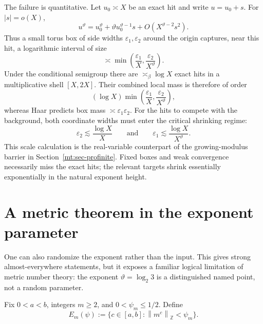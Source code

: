 \documentclass[11pt,oneside]{article}
\theoremstyle{definition}
\theoremstyle{remark}
\newcommand{\Z}{\mathbb Z}
\newcommand{\thetaq}{\vartheta}
\newcommand{\distZ}[1]{\left\lVert #1\right\rVert_{\Z}}
\begin{document}
The failure is quantitative.  Let $u_0\asymp X$ be an exact hit and write $u=u_0+s$.  For
$|s|=o(X)$,
\[
 u^{\thetaq}=u_0^{\thetaq}
 +\thetaq u_0^{\thetaq-1}s+O(X^{\thetaq-2}s^2).
\]
Thus a small torus box of side widths $\varepsilon_1,\varepsilon_2$ around the origin captures,
near this hit, a logarithmic interval of size
\begin{equation}
 \asymp
 \min\!\left(\frac{\varepsilon_1}{X},
              \frac{\varepsilon_2}{X^{\thetaq}}\right).
 \label{mt:eq-one-hit-log-mass}
\end{equation}
Under the conditional semigroup there are $\asymp_\beta\log X$ exact hits in a multiplicative
shell $[X,2X]$.  Their combined local mass is therefore of order
\begin{equation}
 (\log X)
 \min\!\left(\frac{\varepsilon_1}{X},
              \frac{\varepsilon_2}{X^{\thetaq}}\right),
 \label{mt:eq-all-hit-log-mass}
\end{equation}
whereas Haar predicts box mass $\asymp\varepsilon_1\varepsilon_2$.  For the hits to compete with
the background, both coordinate widths must enter the critical shrinking regime:
\begin{equation}
 \varepsilon_2\lesssim\frac{\log X}{X}
 \qquad\text{and}\qquad
 \varepsilon_1\lesssim\frac{\log X}{X^{\thetaq}}.
 \label{mt:eq-visibility-scale}
\end{equation}
This scale calculation is the real-variable counterpart of the growing-modulus barrier in
Section~\ref{mt:sec-profinite}.  Fixed boxes and weak convergence necessarily miss the exact
hits; the relevant targets shrink essentially exponentially in the natural exponent height.

\section{A metric theorem in the exponent parameter}
\label{mt:sec-metric-parameter}

One can also randomize the exponent rather than the input.  This gives strong almost-everywhere
statements, but it exposes a familiar logical limitation of metric number theory: the exponent
$\thetaq=\log_2 3$ is a distinguished named point, not a random parameter.

Fix $0<a<b$, integers $m\ge2$, and $0<\psi_m\le1/2$.  Define
\begin{equation}
 E_m(\psi):=
 \{c\in[a,b]:\distZ{m^c}<\psi_m\}.
 \label{mt:eq-Em}
\end{equation}
\end{document}
